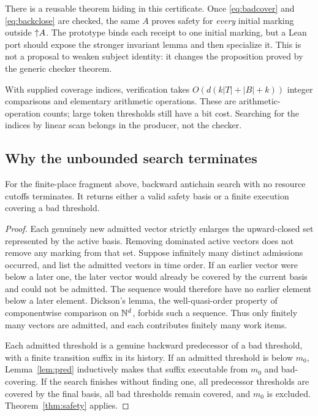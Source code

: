 There is a reusable theorem hiding in this certificate. Once \eqref{eq:badcover} and \eqref{eq:backclose} are checked, the same $A$ proves safety for \emph{every} initial marking outside $\mathord{\uparrow}A$. The prototype binds each receipt to one initial marking, but a Lean port should expose the stronger invariant lemma and then specialize it. This is not a proposal to weaken subject identity: it changes the proposition proved by the generic checker theorem.

With supplied coverage indices, verification takes $O(d(k|T|+|B|+k))$ integer comparisons and elementary arithmetic operations. These are arithmetic-operation counts; large token thresholds still have a bit cost. Searching for the indices by linear scan belongs in the producer, not the checker.

\subsection{Why the unbounded search terminates}
\begin{theorem}
\label{thm:petri-complete}
For the finite-place fragment above, backward antichain search with no resource cutoffs terminates. It returns either a valid safety basis or a finite execution covering a bad threshold.
\end{theorem}
\begin{proof}
Each genuinely new admitted vector strictly enlarges the upward-closed set represented by the active basis. Removing dominated active vectors does not remove any marking from that set. Suppose infinitely many distinct admissions occurred, and list the admitted vectors in time order. If an earlier vector were below a later one, the later vector would already be covered by the current basis and could not be admitted. The sequence would therefore have no earlier element below a later element. Dickson's lemma, the well-quasi-order property of componentwise comparison on $\mathbb N^d$, forbids such a sequence. Thus only finitely many vectors are admitted, and each contributes finitely many work items.

Each admitted threshold is a genuine backward predecessor of a bad threshold, with a finite transition suffix in its history. If an admitted threshold is below $m_0$, Lemma~\ref{lem:pred} inductively makes that suffix executable from $m_0$ and bad-covering. If the search finishes without finding one, all predecessor thresholds are covered by the final basis, all bad thresholds remain covered, and $m_0$ is excluded. Theorem~\ref{thm:safety} applies.
\end{proof}

